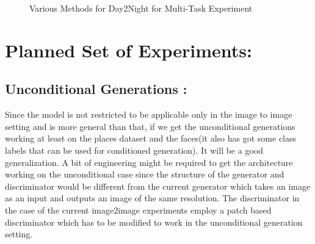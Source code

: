 \begin{figure}%
    \centering
    \caption{Various Methods for Day2Night for Multi-Task Experiment}
    \label{fig:multi-task_day2night}
    \vspace{-3mm}
\end{figure}


\section{Planned Set of Experiments:}
\subsection{Unconditional Generations :}
Since the model is not restricted to be applicable only in the image to image setting and is more general than that, if we get the unconditional generations working at least on the places dataset and the faces(it also has got some class labels that can be used for conditioned generation). It will be a good generalization. A bit of engineering might be required to get the architecture working on the unconditional case since the structure of the generator and discriminator would be different from the current generator which takes an image as an input and outputs an image of the same resolution. The discriminator in the case of the current image2image experiments employ a patch based discriminator which has to be modified to work in the unconditional generation setting.






